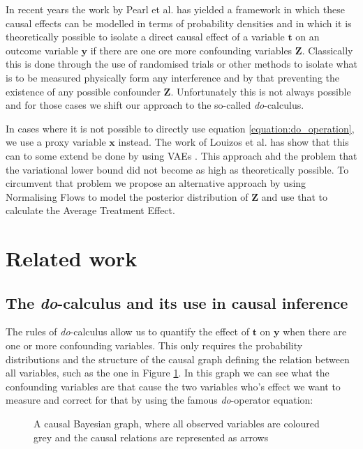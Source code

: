 \documentclass{article}
\newcommand{\bt}{\mathbf{t}}
\newcommand{\bx}{\mathbf{x}}
\newcommand{\by}{\mathbf{y}}
\newcommand{\bZ}{\mathbf{Z}}
\begin{document}
In recent years the work by Pearl et al.\cite{pearl2009causal} \cite{pearl1995causal} has yielded a framework in which these causal effects can be modelled in terms of probability densities and in which it is theoretically possible to isolate a direct causal effect of a variable $\bt$ on an outcome variable $\by$ if there are one ore more confounding variables $\bZ$. Classically this is done through the use of randomised trials or other methods to isolate what is to be measured physically form any interference and by that preventing the existence of any possible confounder $\bZ$. Unfortunately this is not always possible and for those cases we shift our approach to the so-called \textit{do}-calculus. 

In cases where it is not possible to directly use equation \ref{equation:do_operation}, we use a proxy variable $\bx$ instead. The work of Louizos et al. \cite{louizos2017causal} has show that this can to some extend be done by using VAEs \cite{kingma2013auto}. This approach ahd the problem that the variational lower bound did not become as high as theoretically possible. To circumvent that problem we propose an alternative approach by using Normalising Flows \cite{rezende2016variational} to model the posterior distribution of $\bZ$ and use that to calculate the Average Treatment Effect.

\section{Related work}

\subsection{The \textit{do}-calculus and its use in causal inference}
The rules of \textit{do}-calculus allow us to quantify the effect of $\bt$ on $\by$ when there are one or more confounding variables. This only requires the probability distributions and the structure of the causal graph defining the relation between all variables, such as the one in Figure \ref{fig:graph_observed_confounder}. In this graph we can see what the confounding variables are that cause the two variables who's effect we want to measure and correct for that by using the famous \textit{do}-operator equation:

\begin{figure}
    \centering
    
    \caption{A causal Bayesian graph, where all observed variables are coloured grey and the causal relations are represented as arrows}
    \label{fig:graph_observed_confounder}
\end{figure}
\end{document}
